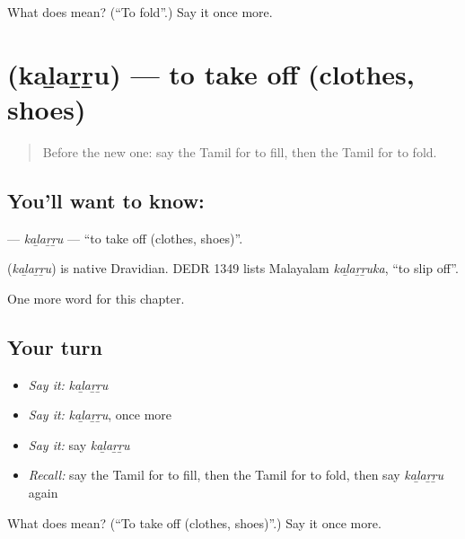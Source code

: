 \begin{tcolorbox}[breakable,colback=teal!4,colframe=teal!35!black,title={Before you move on}]
What does  mean? (\textquotedblleft{}To fold\textquotedblright{}.) Say it once more.
\end{tcolorbox}
\section[\texorpdfstring{\ta{கழற்று} (kaḻaṟṟu)}{கழற்று (kaḻaṟṟu)}]{ (kaḻaṟṟu) — to take off (clothes, shoes)}

\label{lesson:TA-C225-kalarru}



\begin{quote}
Before the new one: say the Tamil for to fill, then the Tamil for to fold.
\end{quote}

\subsection*{You'll want to know: }
\textbf{} — \emph{kaḻaṟṟu} — \textquotedblleft{}to take off (clothes, shoes)\textquotedblright{}.

\begin{cousinweb}
\textbf{} (\emph{kaḻaṟṟu}) is native Dravidian. DEDR 1349 lists Malayalam \emph{kaḻaṟṟuka}, \textquotedblleft{}to slip off\textquotedblright{}.
\end{cousinweb}

\begin{grammarlens}[title={What you've built}]
One more word for this chapter.
\end{grammarlens}

\subsection*{Your turn}
\begin{itemize}
\raggedright
  \item \emph{Say it:} \emph{kaḻaṟṟu}
  \item \emph{Say it:} \emph{kaḻaṟṟu}, once more
  \item \emph{Say it:} say \emph{kaḻaṟṟu}
  \item \emph{Recall:} say the Tamil for to fill, then the Tamil for to fold, then say \emph{kaḻaṟṟu} again
\end{itemize}

\begin{tcolorbox}[breakable,colback=teal!4,colframe=teal!35!black,title={Before you move on}]
What does  mean? (\textquotedblleft{}To take off (clothes, shoes)\textquotedblright{}.) Say it once more.
\end{tcolorbox}
